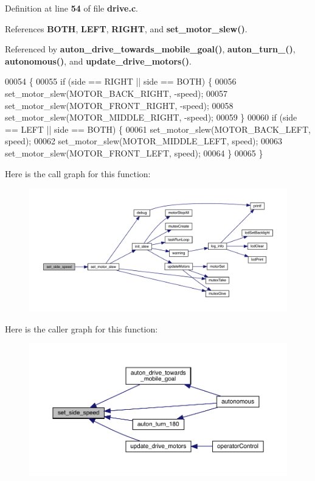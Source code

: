 Definition at line \textbf{ 54} of file \textbf{ drive.\+c}.



References \textbf{ B\+O\+TH}, \textbf{ L\+E\+FT}, \textbf{ R\+I\+G\+HT}, and \textbf{ set\+\_\+motor\+\_\+slew()}.



Referenced by \textbf{ auton\+\_\+drive\+\_\+towards\+\_\+mobile\+\_\+goal()}, \textbf{ auton\+\_\+turn\+\_()}, \textbf{ autonomous()}, and \textbf{ update\+\_\+drive\+\_\+motors()}.


\begin{DoxyCode}
00054                                             \{
00055   \textcolor{keywordflow}{if} (side == RIGHT || side == BOTH) \{
00056     set_motor_slew(MOTOR\_BACK\_RIGHT, -speed);
00057     set_motor_slew(MOTOR\_FRONT\_RIGHT, -speed);
00058     set_motor_slew(MOTOR\_MIDDLE\_RIGHT, -speed);
00059   \}
00060   \textcolor{keywordflow}{if} (side == LEFT || side == BOTH) \{
00061     set_motor_slew(MOTOR\_BACK\_LEFT, speed);
00062     set_motor_slew(MOTOR\_MIDDLE\_LEFT, speed);
00063     set_motor_slew(MOTOR\_FRONT\_LEFT, speed);
00064   \}
00065 \}
\end{DoxyCode}
Here is the call graph for this function\+:
\nopagebreak
\begin{figure}[H]
\begin{center}
\leavevmode
\includegraphics[width=350pt]{drive_8c_a8df41fd50094c065eedc81fc5e6595d1_cgraph}
\end{center}
\end{figure}
Here is the caller graph for this function\+:
\nopagebreak
\begin{figure}[H]
\begin{center}
\leavevmode
\includegraphics[width=350pt]{drive_8c_a8df41fd50094c065eedc81fc5e6595d1_icgraph}
\end{center}
\end{figure}
\mbox{\label{drive_8c_a53d6e35d53ec3e0b1b1c489d8203f204}} 
